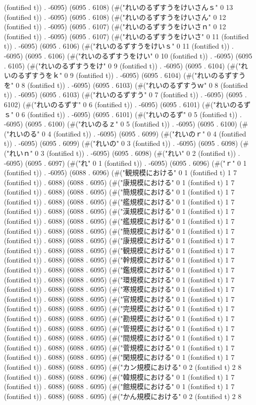 (fontified t)) . -6095) (6095 . 6108) (#("れいのるずすうをけいさんｓ" 0 13 (fontified t)) . -6095) (6095 . 6108) (#("れいのるずすうをけいさん" 0 12 (fontified t)) . -6095) (6095 . 6107) (#("れいのるずすうをけいさｎ" 0 12 (fontified t)) . -6095) (6095 . 6107) (#("れいのるずすうをけいさ" 0 11 (fontified t)) . -6095) (6095 . 6106) (#("れいのるずすうをけいｓ" 0 11 (fontified t)) . -6095) (6095 . 6106) (#("れいのるずすうをけい" 0 10 (fontified t)) . -6095) (6095 . 6105) (#("れいのるずすうをけ" 0 9 (fontified t)) . -6095) (6095 . 6104) (#("れいのるずすうをｋ" 0 9 (fontified t)) . -6095) (6095 . 6104) (#("れいのるずすうを" 0 8 (fontified t)) . -6095) (6095 . 6103) (#("れいのるずすうｗ" 0 8 (fontified t)) . -6095) (6095 . 6103) (#("れいのるずすう" 0 7 (fontified t)) . -6095) (6095 . 6102) (#("れいのるずす" 0 6 (fontified t)) . -6095) (6095 . 6101) (#("れいのるずｓ" 0 6 (fontified t)) . -6095) (6095 . 6101) (#("れいのるず" 0 5 (fontified t)) . -6095) (6095 . 6100) (#("れいのるｚ" 0 5 (fontified t)) . -6095) (6095 . 6100) (#("れいのる" 0 4 (fontified t)) . -6095) (6095 . 6099) (#("れいのｒ" 0 4 (fontified t)) . -6095) (6095 . 6099) (#("れいの" 0 3 (fontified t)) . -6095) (6095 . 6098) (#("れいｎ" 0 3 (fontified t)) . -6095) (6095 . 6098) (#("れい" 0 2 (fontified t)) . -6095) (6095 . 6097) (#("れ" 0 1 (fontified t)) . -6095) (6095 . 6096) (#("ｒ" 0 1 (fontified t)) . -6095) (6088 . 6096) (#("観規模における" 0 1 (fontified t) 1 7 (fontified t)) . 6088) (6088 . 6095) (#("康規模における" 0 1 (fontified t) 1 7 (fontified t)) . 6088) (6088 . 6095) (#("簡規模における" 0 1 (fontified t) 1 7 (fontified t)) . 6088) (6088 . 6095) (#("艦規模における" 0 1 (fontified t) 1 7 (fontified t)) . 6088) (6088 . 6095) (#("漢規模における" 0 1 (fontified t) 1 7 (fontified t)) . 6088) (6088 . 6095) (#("艦規模における" 0 1 (fontified t) 1 7 (fontified t)) . 6088) (6088 . 6095) (#("簡規模における" 0 1 (fontified t) 1 7 (fontified t)) . 6088) (6088 . 6095) (#("康規模における" 0 1 (fontified t) 1 7 (fontified t)) . 6088) (6088 . 6095) (#("観規模における" 0 1 (fontified t) 1 7 (fontified t)) . 6088) (6088 . 6095) (#("幹規模における" 0 1 (fontified t) 1 7 (fontified t)) . 6088) (6088 . 6095) (#("鑑規模における" 0 1 (fontified t) 1 7 (fontified t)) . 6088) (6088 . 6095) (#("環規模における" 0 1 (fontified t) 1 7 (fontified t)) . 6088) (6088 . 6095) (#("寒規模における" 0 1 (fontified t) 1 7 (fontified t)) . 6088) (6088 . 6095) (#("官規模における" 0 1 (fontified t) 1 7 (fontified t)) . 6088) (6088 . 6095) (#("完規模における" 0 1 (fontified t) 1 7 (fontified t)) . 6088) (6088 . 6095) (#("勘規模における" 0 1 (fontified t) 1 7 (fontified t)) . 6088) (6088 . 6095) (#("管規模における" 0 1 (fontified t) 1 7 (fontified t)) . 6088) (6088 . 6095) (#("間規模における" 0 1 (fontified t) 1 7 (fontified t)) . 6088) (6088 . 6095) (#("菅規模における" 0 1 (fontified t) 1 7 (fontified t)) . 6088) (6088 . 6095) (#("閑規模における" 0 1 (fontified t) 1 7 (fontified t)) . 6088) (6088 . 6095) (#("カン規模における" 0 2 (fontified t) 2 8 (fontified t)) . 6088) (6088 . 6096) (#("韓規模における" 0 1 (fontified t) 1 7 (fontified t)) . 6088) (6088 . 6095) (#("館規模における" 0 1 (fontified t) 1 7 (fontified t)) . 6088) (6088 . 6095) (#("かん規模における" 0 2 (fontified t) 2 8 